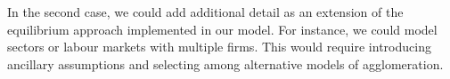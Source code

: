 In the second case, we could add additional detail as an extension of the equilibrium approach implemented in our model. For instance, we could model sectors or labour markets with multiple firms.  %
This would require introducing ancillary assumptions and selecting among alternative models of agglomeration. %



